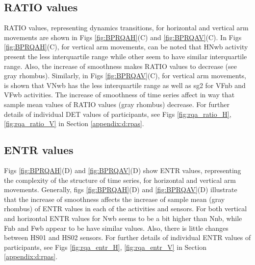 \subsection*{RATIO values}
RATIO values, representing dynamics transitions, for horizontal and 
vertical arm movements are shown in Figs 
\ref{fig:BPRQAH}(C) and \ref{fig:BPRQAV}(C).
In Figs \ref{fig:BPRQAH}(C), for vertical arm movements, 
can be noted that HNwb activity
present the less interquartile range while other seem to have similar
interquartile range. Also, the increase of smoothness makes RATIO
values to decrease (see gray rhombus).
Similarly, in Figs \ref{fig:BPRQAV}(C), for vertical arm movements, 
is shown that VNwb has the less interquartile range as well as 
sg2 for VFnb and VFwb activities. 
The increase of smoothness of time series affect in way that 
sample mean values of RATIO values (gray rhombus) decrease. 
For further details of individual DET values of participants, see 
Figs \ref{fig:rqa_ratio_H}, \ref{fig:rqa_ratio_V} in
Section \ref{appendix:d:rpas}.


\subsection*{ENTR values}
Figs \ref{fig:BPRQAH}(D) and \ref{fig:BPRQAV}(D) show ENTR values, 
representing the complexity of the structure of time series, 
for horizontal and vertical arm movements.
Generally, figs \ref{fig:BPRQAH}(D) and \ref{fig:BPRQAV}(D) 
illustrate that the increase of smoothness affects the increase of 
sample mean (gray rhombus) of ENTR values in each of 
the activities and sensors. 
For both vertical and horizontal ENTR values for Nwb seems 
to be a bit higher than Nnb, while Fnb and Fwb appear to be 
have similar values.
Also, there is little changes between HS01 and HS02 sensors.
For further details of individual ENTR values of participants, see 
Figs \ref{fig:rqa_entr_H}, \ref{fig:rqa_entr_V} in
Section \ref{appendix:d:rpas}.






